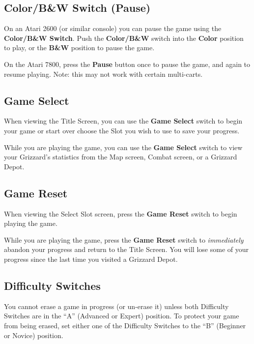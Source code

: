 \documentclass[10pt,twocolumn,openany,article]{memoir}
\begin{document}
\else

\subsection{Color/B\&W Switch (Pause)}

On an Atari 2600  (or similar console) you can pause  the game using the
\textbf{Color/B\&W Switch}. Push the \textbf{Color/B\&W} switch into the
\textbf{Color} position to play, or  the \textbf{B\&W} position to pause
the game.

On the  Atari 7800, press  the \textbf{Pause}  button once to  pause the
game, and  again to  resume playing.  \ifdefined\ATARIAGESAVE\else Note:
this may not work with certain multi-carts. \fi

\fi

\subsection{Game Select}

When  viewing the  Title Screen,  you can  use the  \textbf{Game Select}
switch to
\ifdefined\NOSAVE
begin your game or start over
\else
choose the Slot you wish to use to save your progress.
\fi

While you  are playing the  game, you  can use the  \textbf{Game Select}
switch to view your Grizzard's  statistics from the Map screen, Combat
screen, or a Grizzard Depot.

\subsection{Game Reset}

When  viewing the  Select  Slot screen,  press  the \textbf{Game  Reset}
switch to begin playing the game.

While you are playing the game,  press the \textbf{Game Reset} switch to
\emph{immediately} abandon your progress and return to the Title Screen.
You will  lose some  of your  progress since the  last time  you visited
a Grizzard Depot.

\subsection{Difficulty Switches}

\ifdefined\NOSAVE\else

You  cannot erase  a  game  in progress  (or  un-erase  it) unless  both
Difficulty  Switches are  in the  ``A'' (Advanced  or Expert)  position.
To protect your game from being erased, set either one of the Difficulty
Switches to the ``B'' (Beginner or Novice) position.
\end{document}
